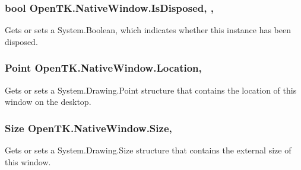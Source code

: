 \hypertarget{class_open_t_k_1_1_native_window_af15932872565db89a7f0fe92f9216699}{
\subsubsection[{Is\-Disposed}]{\setlength{\rightskip}{0pt plus 5cm}bool Open\-T\-K.\-Native\-Window.\-Is\-Disposed\hspace{0.3cm}{\ttfamily [get]}, {\ttfamily [set]}, {\ttfamily [protected]}}}\label{class_open_t_k_1_1_native_window_af15932872565db89a7f0fe92f9216699}


Gets or sets a System.\-Boolean, which indicates whether this instance has been disposed. 

\hypertarget{class_open_t_k_1_1_native_window_ab23cac873e75d052d5ccd7f9f709d80c}{
\subsubsection[{Location}]{\setlength{\rightskip}{0pt plus 5cm}Point Open\-T\-K.\-Native\-Window.\-Location\hspace{0.3cm}{\ttfamily [get]}, {\ttfamily [set]}}}\label{class_open_t_k_1_1_native_window_ab23cac873e75d052d5ccd7f9f709d80c}


Gets or sets a System.\-Drawing.\-Point structure that contains the location of this window on the desktop. 

\hypertarget{class_open_t_k_1_1_native_window_a956be027bb7ba880507909d919b2ad6a}{
\subsubsection[{Size}]{\setlength{\rightskip}{0pt plus 5cm}Size Open\-T\-K.\-Native\-Window.\-Size\hspace{0.3cm}{\ttfamily [get]}, {\ttfamily [set]}}}\label{class_open_t_k_1_1_native_window_a956be027bb7ba880507909d919b2ad6a}


Gets or sets a System.\-Drawing.\-Size structure that contains the external size of this window. 

